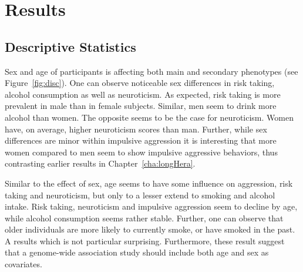 \section{Results}
\label{sec:results_ukb_assoc}

\subsection{Descriptive Statistics}
\label{sub:descriptive_statistics}

Sex and age of participants is affecting both main and secondary phenotypes (see Figure~\ref{fig:disc}).
One can observe noticeable sex differences in risk taking, alcohol consumption as well as neuroticism.
As expected, risk taking is more prevalent in male than in female subjects. 
Similar, men seem to drink more alcohol than women.
The opposite seems to be the case for neuroticism.
Women have, on average, higher neuroticism scores than man.
Further,  while sex differences are minor within impulsive aggression it is interesting that more women compared to men seem to show impulsive aggressive behaviors, thus contrasting earlier results in Chapter~\ref{cha:longHera}. 

Similar to the effect of sex, age seems to have some influence on aggression, risk taking and neuroticism, but only to a lesser extend to smoking and alcohol intake.
Risk taking, neuroticism and impulsive aggression seem to decline by age, while alcohol consumption seems rather stable.
Further, one can observe that older individuals are more likely to currently smoke, or have smoked in the past.
A results which is not particular surprising.
Furthermore, these result suggest that a genome-wide association study should include both age and sex as covariates.

